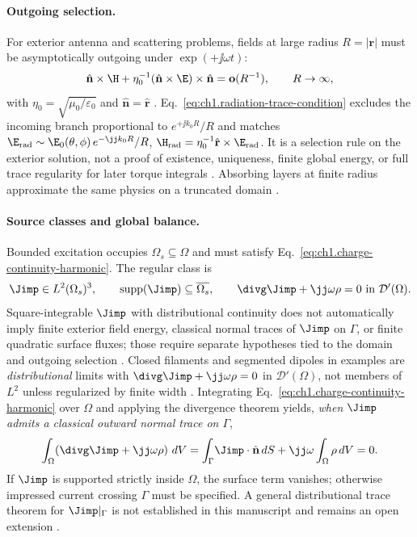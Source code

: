 \paragraph{Outgoing selection.}
For exterior antenna and scattering problems, fields at large radius $R=|\mathbf{r}|$ must be asymptotically outgoing under $\exp(+\jj\omega t)$:
\begin{equation}
\label{eq:ch1.radiation-trace-condition}
\hat{\mathbf{n}}\times\H
+\eta_0^{-1}(\hat{\mathbf{n}}\times\E)\times\hat{\mathbf{n}}
=\mathbf{o}(R^{-1}),\qquad R\to\infty,
\end{equation}
with $\eta_0=\sqrt{\mu_0/\varepsilon_0}$ and $\hat{\mathbf{n}}=\hat{\mathbf{r}}$ \cite{stratton1941,sommerfeld1949}. Eq.~\eqref{eq:ch1.radiation-trace-condition} excludes the incoming branch proportional to $e^{+\jj k_0 R}/R$ and matches $\E_{\mathrm{rad}}\sim \E_0(\theta,\phi)\,e^{-\jj k_0 R}/R$, $\H_{\mathrm{rad}}=\eta_0^{-1}\hat{\mathbf{r}}\times\E_{\mathrm{rad}}$. It is a selection rule on the exterior solution, not a proof of existence, uniqueness, finite global energy, or full trace regularity for later torque integrals \cite{harrington2001}. Absorbing layers at finite radius approximate the same physics on a truncated domain \cite{hansen1988}.

\paragraph{Source classes and global balance.}
Bounded excitation occupies $\Omega_s\subseteq\Omega$ and must satisfy Eq.~\eqref{eq:ch1.charge-continuity-harmonic}. The regular class is
\begin{equation}
\label{eq:ch1.source-charge-continuous}
\Jimp\in L^2(\Omega_s)^3,\qquad
\operatorname{supp}(\Jimp)\subseteq\overline{\Omega_s},\qquad
\divg\Jimp+\jj\omega\rho=0
\ \text{in }\mathcal{D}'(\Omega).
\end{equation}
Square-integrable $\Jimp$ with distributional continuity does not automatically imply finite exterior field energy, classical normal traces of $\Jimp$ on $\Gamma$, or finite quadratic surface fluxes; those require separate hypotheses tied to the domain and outgoing selection \cite{stratton1941}. Closed filaments and segmented dipoles in examples are \emph{distributional} limits with $\divg\Jimp+\jj\omega\rho=0$ in $\mathcal{D}'(\Omega)$, not members of $L^2$ unless regularized by finite width \cite{stratton1941,jackson1999}. Integrating Eq.~\eqref{eq:ch1.charge-continuity-harmonic} over $\Omega$ and applying the divergence theorem yields, \emph{when $\Jimp$ admits a classical outward normal trace on $\Gamma$},
\begin{equation}
\label{eq:ch1.global-charge-compatibility}
\int_{\Omega}\!\left(\divg\Jimp+\jj\omega\rho\right)\,dV
=\int_{\Gamma}\!\Jimp\cdot\hat{\mathbf{n}}\,dS+\jj\omega\int_{\Omega}\rho\,dV=0.
\end{equation}
If $\Jimp$ is supported strictly inside $\Omega$, the surface term vanishes; otherwise impressed current crossing $\Gamma$ must be specified. A general distributional trace theorem for $\Jimp|_\Gamma$ is not established in this manuscript and remains an open extension \cite{maxwell1873,stratton1941}.

